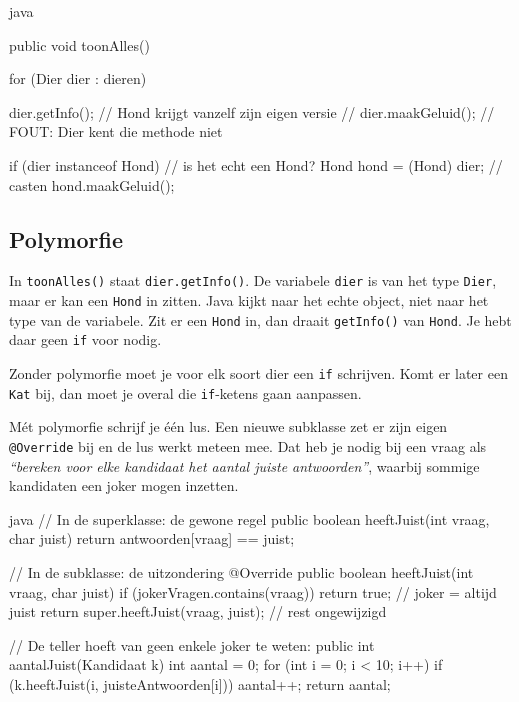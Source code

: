\documentclass[a4paper,11pt]{article}
\begin{document}
\begin{codeblock}{java}
{            public void toonAlles() {
                    for (Dier dier : dieren) {
                            dier.getInfo();   // Hond krijgt vanzelf zijn eigen versie
                            // dier.maakGeluid(); // FOUT: Dier kent die methode niet

                            if (dier instanceof Hond) {          // is het echt een Hond?
                                    Hond hond = (Hond) dier;         // casten
                                    hond.maakGeluid();
                                }
                        }
                }
        }
\end{codeblock}

\subsection{Polymorfie}

In \texttt{toonAlles()} staat \texttt{dier.getInfo()}. De variabele
\texttt{dier} is van het type \texttt{Dier}, maar er kan een \texttt{Hond} in
zitten. Java kijkt naar het echte object, niet naar het type van de variabele.
Zit er een \texttt{Hond} in, dan draait \texttt{getInfo()} van \texttt{Hond}. Je
hebt daar geen \texttt{if} voor nodig.

\begin{conceptbox}
    Zonder polymorfie moet je voor elk soort dier een \texttt{if} schrijven. Komt er
    later een \texttt{Kat} bij, dan moet je overal die \texttt{if}-ketens gaan
    aanpassen.

    \medskip
    M\'et polymorfie schrijf je \'e\'en lus. Een nieuwe subklasse zet er zijn eigen
    \texttt{@Override} bij en de lus werkt meteen mee. Dat heb je nodig bij een vraag
    als \textit{``bereken voor elke kandidaat het aantal juiste antwoorden''}, waarbij
    sommige kandidaten een joker mogen inzetten.
\end{conceptbox}

\begin{codeblock}{java}
    // In de superklasse: de gewone regel
    public boolean heeftJuist(int vraag, char juist) {
            return antwoorden[vraag] == juist;
        }

    // In de subklasse: de uitzondering
    @Override
    public boolean heeftJuist(int vraag, char juist) {
            if (jokerVragen.contains(vraag)) {
                    return true;                        // joker = altijd juist
                }
            return super.heeftJuist(vraag, juist);  // rest ongewijzigd
        }

    // De teller hoeft van geen enkele joker te weten:
    public int aantalJuist(Kandidaat k) {
            int aantal = 0;
            for (int i = 0; i < 10; i++) {
                    if (k.heeftJuist(i, juisteAntwoorden[i])) { aantal++; }
                }
            return aantal;
        }
\end{codeblock}
\end{document}
